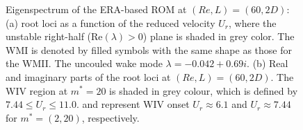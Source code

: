 \begin{figure}
\begin{subfigure}{0.495\textwidth}
    \caption{}
    \label{•}
    \end{subfigure} 
  \caption{Eigenspectrum of the ERA-based ROM at $(Re,L)=(60,2D)$: 
     (a) root loci as a function of the reduced velocity $U_r$, 
     where the unstable right-half (Re$(\lambda) > 0$) plane is shaded in grey color.
     The WMI is denoted by filled symbols with the same shape as those for the WMII. 
     The uncouled wake mode $\lambda=-0.042+0.69i$.
     (b) Real and imaginary parts of the root loci at $(Re,L)=(60,2D)$.
     The WIV region at $m^*=20$ is shaded in grey colour, which is defined by 
     $7.44 \le U_{r} \le 11.0$.
     {\protect\reddash} and {\protect\bluedash} represent WIV onset $U_r \approx 6.1$ 
      and $U_r \approx 7.44$ for $m^*=(2,20)$, respectively.}
\label{fig:ld2_eig}  
\end{figure}




